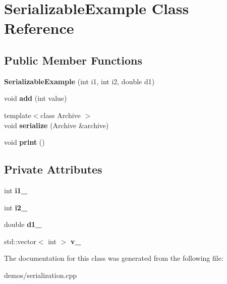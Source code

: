 \hypertarget{classSerializableExample}{}\section{Serializable\+Example Class Reference}
\label{classSerializableExample}
\subsection*{Public Member Functions}
\begin{DoxyCompactItemize}
\item 
{\bfseries Serializable\+Example} (int i1, int i2, double d1)\hypertarget{classSerializableExample_a020d465dad63e984c2d665f5e59f7b85}{}\label{classSerializableExample_a020d465dad63e984c2d665f5e59f7b85}

\item 
void {\bfseries add} (int value)\hypertarget{classSerializableExample_ad31bb675456f6d5ff330c0a9ed44935f}{}\label{classSerializableExample_ad31bb675456f6d5ff330c0a9ed44935f}

\item 
{\footnotesize template$<$class Archive $>$ }\\void {\bfseries serialize} (Archive \&archive)\hypertarget{classSerializableExample_abd83ad2d93905e446c27faa83ccc27c4}{}\label{classSerializableExample_abd83ad2d93905e446c27faa83ccc27c4}

\item 
void {\bfseries print} ()\hypertarget{classSerializableExample_a045de0e6c3f89f14f0b088dd8978bce2}{}\label{classSerializableExample_a045de0e6c3f89f14f0b088dd8978bce2}

\end{DoxyCompactItemize}
\subsection*{Private Attributes}
\begin{DoxyCompactItemize}
\item 
int {\bfseries i1\+\_\+}\hypertarget{classSerializableExample_ab92737737108ec75894cdd774f382456}{}\label{classSerializableExample_ab92737737108ec75894cdd774f382456}

\item 
int {\bfseries i2\+\_\+}\hypertarget{classSerializableExample_ac5b8225f7afd034537b83b9556f6e7ed}{}\label{classSerializableExample_ac5b8225f7afd034537b83b9556f6e7ed}

\item 
double {\bfseries d1\+\_\+}\hypertarget{classSerializableExample_a6e0725b030db00c68689de4f2d23edfe}{}\label{classSerializableExample_a6e0725b030db00c68689de4f2d23edfe}

\item 
std\+::vector$<$ int $>$ {\bfseries v\+\_\+}\hypertarget{classSerializableExample_a6704295d511ce08e60005e153ca39b9a}{}\label{classSerializableExample_a6704295d511ce08e60005e153ca39b9a}

\end{DoxyCompactItemize}


The documentation for this class was generated from the following file\+:\begin{DoxyCompactItemize}
\item 
demos/serialization.\+cpp\end{DoxyCompactItemize}
